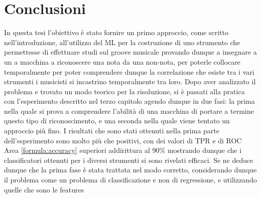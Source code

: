 \chapter*{Conclusioni}
In questa tesi l'obiettivo è stato fornire un primo approccio, come scritto nell'introduzione, all'utilizzo del ML per la costruzione di uno strumento che permettesse di effettuare studi sul groove musicale provando dunque a insegnare a un a macchina a riconoscere una nota da una non-nota, per poterle collocare temporalmente per poter comprendere dunque la correlazione che esiste tra i vari strumenti i musicisti si incastrino temporalmente tra loro. Dopo aver analizzato il problema e trovato un modo teorico per la risoluzione, si è passati alla pratica con l'esperimento descritto nel terzo capitolo agendo dunque in due fasi: la prima nella quale si prova a comprendere l'abilità di una macchina di portare a termine questo tipo di riconoscimento, e una seconda nella quale viene tentato un approccio più fino. I risultati che sono stati ottenuti nella prima parte dell'esperimento sono molto più che positivi, con dei valori di TPR e di ROC Area \ref{formula:accuracy} superiori addirittura al 90\% mostrando dunque che i classificatori ottenuti per i diversi strumenti si sono rivelati efficaci. Se ne deduce dunque che la prima fase è stata trattata nel modo corretto, considerando dunque il problema come un problema di classificazione e non di regressione, e utilizzando quelle che sono le features 